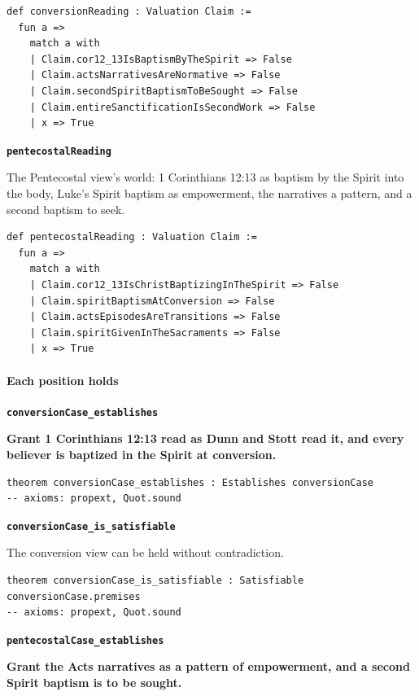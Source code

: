 \documentclass[11pt]{article}
\begin{document}
{\small\begin{verbatim}
def conversionReading : Valuation Claim :=
  fun a =>
    match a with
    | Claim.cor12_13IsBaptismByTheSpirit => False
    | Claim.actsNarrativesAreNormative => False
    | Claim.secondSpiritBaptismToBeSought => False
    | Claim.entireSanctificationIsSecondWork => False
    | x => True
\end{verbatim}}
\par\medskip\noindent\textbf{\texttt{pentecostal\allowbreak{}Reading}}\par\nobreak\noindent
The Pentecostal view’s world: 1 Corinthians 12:13 as baptism by the Spirit into the body, Luke’s Spirit baptism as empowerment, the narratives a pattern, and a second baptism to seek.

{\small\begin{verbatim}
def pentecostalReading : Valuation Claim :=
  fun a =>
    match a with
    | Claim.cor12_13IsChristBaptizingInTheSpirit => False
    | Claim.spiritBaptismAtConversion => False
    | Claim.actsEpisodesAreTransitions => False
    | Claim.spiritGivenInTheSacraments => False
    | x => True
\end{verbatim}}
\paragraph*{Each position holds}
\leavevmode\par\nobreak
\par\medskip\noindent\textbf{\texttt{conversion\allowbreak{}Case\_\allowbreak{}establishes}}\par\nobreak\noindent
\textbf{Grant 1 Corinthians 12:13 read as Dunn and Stott read it, and every believer is baptized in the Spirit at conversion.}

{\small\begin{verbatim}
theorem conversionCase_establishes : Establishes conversionCase
-- axioms: propext, Quot.sound
\end{verbatim}}
\par\medskip\noindent\textbf{\texttt{conversion\allowbreak{}Case\_\allowbreak{}is\_\allowbreak{}satisfiable}}\par\nobreak\noindent
The conversion view can be held without contradiction.

{\small\begin{verbatim}
theorem conversionCase_is_satisfiable : Satisfiable conversionCase.premises
-- axioms: propext, Quot.sound
\end{verbatim}}
\par\medskip\noindent\textbf{\texttt{pentecostal\allowbreak{}Case\_\allowbreak{}establishes}}\par\nobreak\noindent
\textbf{Grant the Acts narratives as a pattern of empowerment, and a second Spirit baptism is to be sought.}
\end{document}
